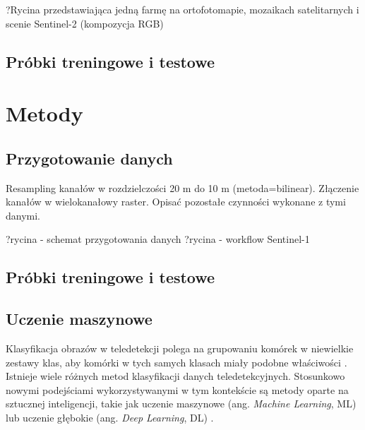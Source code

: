 \documentclass{amuthesis}
\begin{document}
?Rycina przedstawiająca jedną farmę na ortofotomapie, mozaikach
satelitarnych i scenie Sentinel-2 (kompozycja RGB)

\hypertarget{sec-samples-materials}{%
\section{Próbki treningowe i testowe}\label{sec-samples-materials}}


\hypertarget{sec-metody}{%
\chapter{Metody}\label{sec-metody}}

\hypertarget{sec-processing}{%
\section{Przygotowanie danych}\label{sec-processing}}

Resampling kanałów w rozdzielczości 20 m do 10 m (metoda=bilinear).
Złączenie kanałów w wielokanałowy raster. Opisać pozostałe czynności
wykonane z tymi danymi.

?rycina - schemat przygotowania danych ?rycina - workflow Sentinel-1

\hypertarget{sec-samples-methods}{%
\section{Próbki treningowe i testowe}\label{sec-samples-methods}}

\hypertarget{sec-machine-learning}{%
\section{Uczenie maszynowe}\label{sec-machine-learning}}

Klasyfikacja obrazów w teledetekcji polega na grupowaniu komórek w
niewielkie zestawy klas, aby komórki w tych samych klasach miały podobne
właściwości \autocite{ismail_2009_classification}. Istnieje wiele
różnych metod klasyfikacji danych teledetekcyjnych. Stosunkowo nowymi
podejściami wykorzystywanymi w tym kontekście są metody oparte na
sztucznej inteligencji, takie jak uczenie maszynowe (ang. \emph{Machine
Learning}, ML) lub uczenie głębokie (ang. \emph{Deep Learning}, DL)
\autocite{hejmanowska_2020_dane}.
\end{document}
